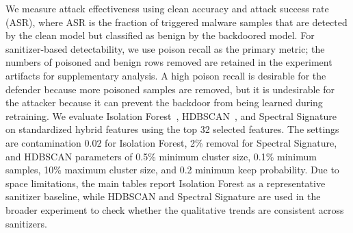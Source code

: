 We measure attack effectiveness using clean accuracy and attack success rate (ASR), where ASR is the fraction of triggered malware samples that are detected by the clean model but classified as benign by the backdoored model.
For sanitizer-based detectability, we use poison recall as the primary metric; the numbers of poisoned and benign rows removed are retained in the experiment artifacts for supplementary analysis.
A high poison recall is desirable for the defender because more poisoned samples are removed, but it is undesirable for the attacker because it can prevent the backdoor from being learned during retraining.
We evaluate Isolation Forest~\cite{isolation_forest}, HDBSCAN~\cite{hdbscan}, and Spectral Signature~\cite{spectral_signature} on standardized hybrid features using the top 32 selected features.
The settings are contamination $0.02$ for Isolation Forest, 2\% removal for Spectral Signature, and HDBSCAN parameters of 0.5\% minimum cluster size, 0.1\% minimum samples, 10\% maximum cluster size, and 0.2 minimum keep probability.
Due to space limitations, the main tables report Isolation Forest as a representative sanitizer baseline, while HDBSCAN and Spectral Signature are used in the broader experiment to check whether the qualitative trends are consistent across sanitizers.
